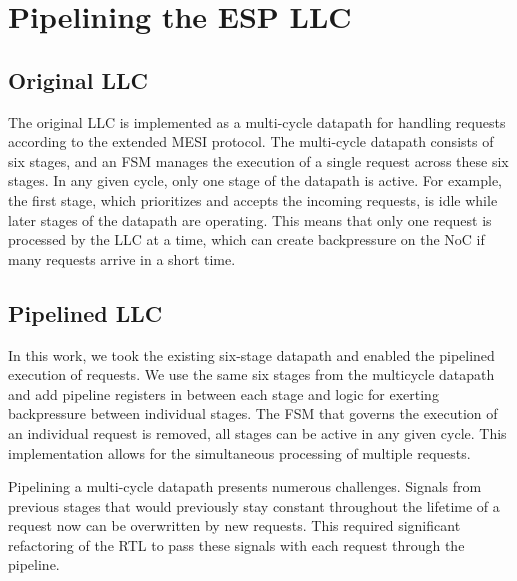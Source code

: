 \section{Pipelining the ESP LLC}
\label{sec:llcImplementations}
\subsection{Original LLC}
The original LLC is implemented as a multi-cycle datapath for handling requests
according to the extended MESI protocol. The multi-cycle datapath consists of
six stages, and an FSM manages the execution of a single request across these
six stages.  In any given cycle, only one stage of the datapath is active. For
example, the first stage, which prioritizes and accepts the incoming requests,
is idle while later stages of the datapath are operating. This means that only
one request is processed by the LLC at a time, which can create backpressure
on the NoC if many requests arrive in a short time.
\subsection{Pipelined LLC}
In this work, we took the existing six-stage datapath and enabled the pipelined
execution of requests. We use the same six stages from the multicycle datapath
and add pipeline registers in between each stage and logic for exerting backpressure
between individual stages. The FSM that governs the execution of an individual request
is removed, all stages can be active in any given cycle. This implementation allows
for the simultaneous processing of multiple requests.

\par Pipelining a multi-cycle datapath presents numerous challenges. Signals
from previous stages that would previously stay constant throughout the
lifetime of a request now can be overwritten by new requests. This required
significant refactoring of the RTL to pass these signals with each request
through the pipeline.

